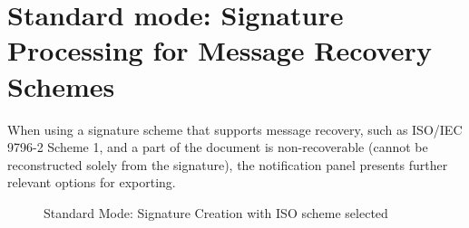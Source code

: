 \documentclass[]{final_report}
\begin{document}
\section{Standard mode: Signature Processing for Message Recovery Schemes}

When using a signature scheme that supports message recovery, such as ISO/IEC 9796-2 Scheme 1, and a part of the document is non-recoverable (cannot be reconstructed solely from the signature), the notification panel presents further relevant options for exporting.

\begin{figure}[H]
    \centering %
    
    \begin{minipage}{0.49\textwidth}
        \centering
       \caption{Standard Mode: Signature Creation with ISO scheme selected}
        \label{fig:image1}
    \end{minipage}
    \hfill %
    \begin{minipage}{0.49\textwidth}
        \centering

\end{minipage}
\end{figure}
\end{document}
